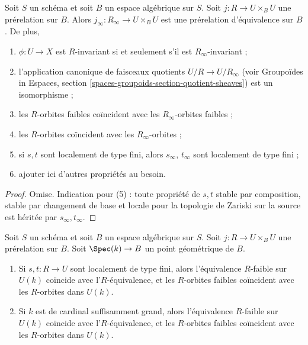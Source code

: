 \begin{lemma}
\label{lemma-make-pre-equivalence}
Soit $S$ un schéma et soit $B$ un espace algébrique sur $S$.
Soit $j : R \to U \times_B U$ une prérelation sur $B$.
Alors $j_\infty : R_\infty \to U \times_B U$ est une
prérelation d'équivalence sur $B$. De plus,
\begin{enumerate}
\item $\phi : U \to X$ est $R$-invariant si et seulement s'il est
$R_\infty$-invariant ;
\item l'application canonique de faisceaux quotients $U/R \to U/R_\infty$ (voir
Groupoïdes in Espaces, section \ref{spaces-groupoids-section-quotient-sheaves})
est un isomorphisme ;
\item les $R$-orbites faibles coïncident avec les $R_\infty$-orbites faibles ;
\item les $R$-orbites coïncident avec les $R_\infty$-orbites ;
\item si $s, t$ sont localement de type fini, alors $s_\infty$, $t_\infty$
sont localement de type fini ;
\item ajouter ici d'autres propriétés au besoin.
\end{enumerate}
\end{lemma}

\begin{proof}
Omise. Indication pour (5) : toute propriété de $s, t$ stable par composition,
stable par changement de base et locale pour la topologie de Zariski sur la source
est héritée par $s_\infty, t_\infty$.
\end{proof}

\begin{lemma}
\label{lemma-geometric-orbits}
Soit $S$ un schéma et soit $B$ un espace algébrique sur $S$.
Soit $j : R \to U \times_B U$ une prérelation sur $B$.
Soit $\Spec(k) \to B$ un point géométrique de $B$.
\begin{enumerate}
\item Si $s, t : R \to U$ sont localement de type fini,
alors l'équivalence $R$-faible sur $U(k)$ coïncide avec l'$R$-équivalence, et
les $R$-orbites faibles coïncident avec les $R$-orbites dans $U(k)$.
\item Si $k$ est de cardinal suffisamment grand, alors l'équivalence $R$-faible
sur $U(k)$ coïncide avec l'$R$-équivalence, et les $R$-orbites faibles
coïncident avec les $R$-orbites dans $U(k)$.
\end{enumerate}
\end{lemma}

